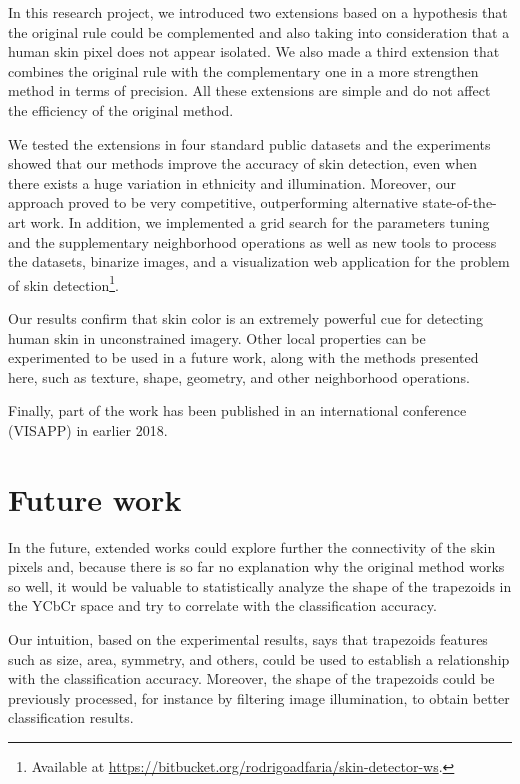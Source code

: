 In this research project, we introduced two extensions based on a hypothesis that the original rule could be complemented and also taking into consideration that a human skin pixel does not appear isolated. We also made a third extension that combines the original rule with the complementary one in a more strengthen method in terms of precision. All these extensions are simple and do not affect the efficiency of the original method.

We tested the extensions in four standard public datasets and the experiments showed that our methods improve the accuracy of skin detection, even when there exists a huge variation in ethnicity and illumination. Moreover, our approach proved to be very competitive, outperforming alternative state-of-the-art work. In addition, we implemented a grid search for the parameters tuning and the supplementary neighborhood operations as well as new tools to process the datasets, binarize images, and a visualization web application for the problem of skin detection\footnote{Available at \url{https://bitbucket.org/rodrigoadfaria/skin-detector-ws}.}.

Our results confirm that skin color is an extremely powerful cue for detecting human skin in unconstrained imagery. Other local properties can be experimented to be used in a future work, along with the methods presented here, such as texture, shape, geometry, and other neighborhood operations.

Finally, part of the work has been published in an international conference  (VISAPP) in earlier 2018.


\section{Future work}
\label{sec:future_work}

In the future, extended works could explore further the connectivity of the skin pixels and, because there is so far no explanation why the original method works so well, it would be valuable to statistically analyze the shape of the trapezoids in the YCbCr space and try to correlate with the classification accuracy.

Our intuition, based on the experimental results, says that trapezoids features such as size, area, symmetry, and others, could be used to establish a relationship with the classification accuracy. Moreover, the shape of the trapezoids could be previously processed, for instance by filtering image illumination, to obtain better classification results.

